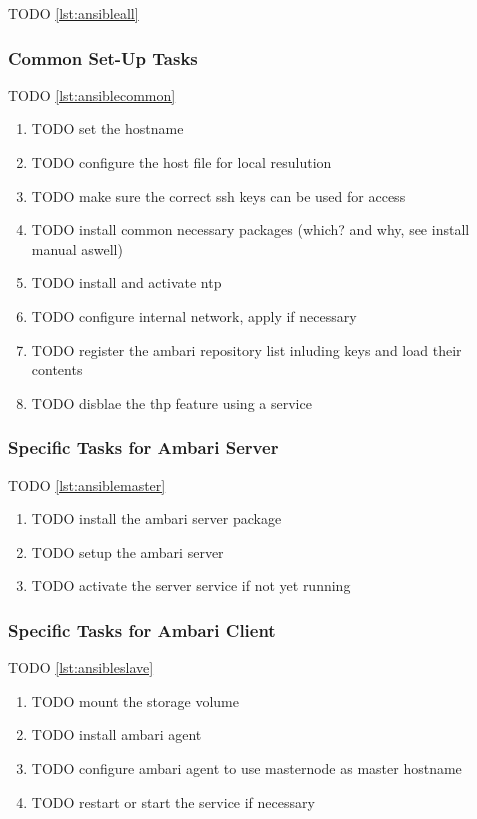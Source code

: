 TODO \vref{lst:ansibleall}

\subsubsection{Common Set-Up Tasks}
TODO \vref{lst:ansiblecommon}

\begin{enumerate}
    \item TODO set the hostname
    \item TODO configure the host file for local resulution
    \item TODO make sure the correct ssh keys can be used for access
    \item TODO install common necessary packages (which? and why, see install manual aswell)
    \item TODO install and activate ntp
    \item TODO configure internal network, apply if necessary
    \item TODO register the ambari repository list inluding keys and load their contents
    \item TODO disblae the thp feature using a service
    
\end{enumerate}

\subsubsection{Specific Tasks for Ambari Server}
TODO \vref{lst:ansiblemaster}

\begin{enumerate}
    \item TODO install the ambari server package
    \item TODO setup the ambari server
    \item TODO activate the server service if not yet running
\end{enumerate}

\subsubsection{Specific Tasks for Ambari Client}
TODO \vref{lst:ansibleslave}

\begin{enumerate}
    \item TODO mount the storage volume
    \item TODO install ambari agent
    \item TODO configure ambari agent to use masternode as master hostname
    \item TODO restart or start the service if necessary
\end{enumerate}

